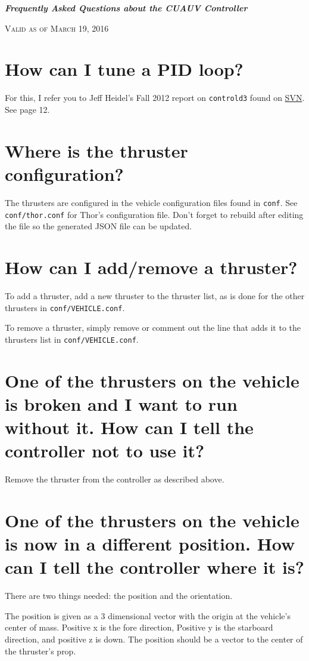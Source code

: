 \documentclass[11pt]{article}
\newcommand{\question}[1] %
{
  \section{#1}
}
\begin{document}
\begin{center}
\Huge{\bf \emph{Frequently Asked Questions about the CUAUV Controller}} %
\end{center}

\begin{center}
\textsc{Valid as of March 19, 2016}
\end{center}

\tableofcontents

\question{How can I tune a PID loop?}

    For this, I refer you to Jeff Heidel's Fall 2012 report on \texttt{controld3} found on \href{https://cuauv.org/svn/business/Semester Reports/2012 Fall/CS Credit/Technical Documentation/controld3.pdf}{SVN}. See page 12.\\

\question{Where is the thruster configuration?}

    The thrusters are configured in the vehicle configuration files found in \texttt{conf}. See \texttt{conf/thor.conf} for Thor's configuration file. Don't forget to rebuild after editing the file so the generated JSON file can be updated.\\

\question{How can I add/remove a thruster?}

    To add a thruster, add a new thruster to the thruster list, as is done for the other thrusters in \texttt{conf/VEHICLE.conf}.

    To remove a thruster, simply remove or comment out the line that adds it to the thrusters list in \texttt{conf/VEHICLE.conf}.\\

\question{One of the thrusters on the vehicle is broken and I want to run without it. How can I tell the controller not to use it?}

    Remove the thruster from the controller as described above.\\

\question{One of the thrusters on the vehicle is now in a different position. How can I tell the controller where it is?}

    There are two things needed: the position and the orientation.

    The position is given as a 3 dimensional vector with the origin at the vehicle's center of mass. Positive x is the fore direction, Positive y is the starboard direction, and positive z is down. The position should be a vector to the center of the thruster's prop.
\end{document}
